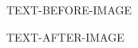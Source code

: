 \documentclass[11pt,a4paper]{article}
\begin{document}
TEXT-BEFORE-IMAGE

\begin{figure}[h]
\end{figure}

TEXT-AFTER-IMAGE
\end{document}
